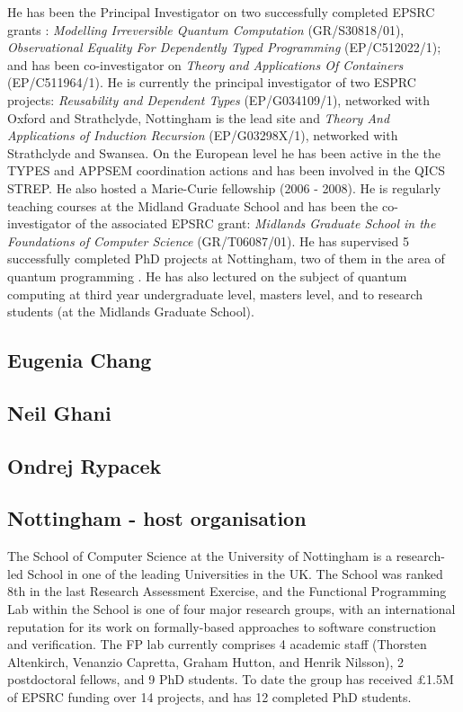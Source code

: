 \documentclass[a4paper]{article}
\newcommand{\citetrack}[1]{\cite{#1}}
\begin{document}
He has been the Principal Investigator on two successfully completed
EPSRC grants : \emph{Modelling Irreversible Quantum Computation}
(GR/S30818/01), \emph{Observational Equality For Dependently Typed
  Programming} (EP/C512022/1); and has been co-investigator on
\emph{Theory and Applications Of Containers} (EP/C511964/1). 
He is currently the principal investigator of two ESPRC
projects: \emph{Reusability and Dependent Types} (EP/G034109/1), 
networked with
Oxford and Strathclyde, Nottingham is the lead site and 
\emph{Theory And Applications of Induction
  Recursion} (EP/G03298X/1), networked with Strathclyde and Swansea. 
On the European level he has been active in the the
TYPES and APPSEM coordination actions and has been involved in the
QICS STREP. He also hosted a Marie-Curie fellowship (2006 - 2008). He
is regularly teaching courses at the Midland Graduate School and has
been the co-investigator of the associated EPSRC grant: \emph{Midlands
  Graduate School in the Foundations of Computer Science}
(GR/T06087/01). He has supervised 5 successfully completed PhD
projects at Nottingham, two of them in the area of quantum
programming \citetrack{jjgthesis,asg:thesis}. He has also lectured 
on the subject of quantum computing at third year
undergraduate level, masters level, and to research students 
(at the Midlands Graduate School).

\subsection*{Eugenia Chang}

\subsection*{Neil Ghani}

\subsection*{Ondrej Rypacek}


\subsection*{Nottingham - host organisation}

The School of Computer Science at the University of Nottingham
is a research-led School in one of the leading Universities in
the UK.	 The School was ranked 8th in the last Research Assessment
Exercise, and the Functional Programming Lab within the School is
one of four major research groups, with an international reputation
for its work on formally-based approaches to software construction
and verification.  The FP lab currently comprises 4 academic staff
(Thorsten Altenkirch, Venanzio Capretta, Graham Hutton, and Henrik
Nilsson), 2 postdoctoral fellows, and 9 PhD students.  To date the
group has received \pounds 1.5M of EPSRC funding over 14 projects,
and has 12 completed PhD students.
\end{document}
